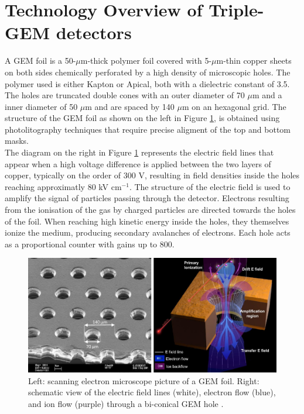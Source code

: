   \section{Technology Overview of Triple-GEM detectors}

    A GEM foil is a 50-$\mu$m-thick polymer foil covered with 5-$\mu$m-thin copper sheets on both sides chemically perforated by a high density of microscopic holes. The polymer used is either Kapton or Apical, both with a dielectric constant of 3.5. The holes are truncated double cones with an outer diameter of 70 $\mu$m and a inner diameter of 50 $\mu$m and are spaced by 140 $\mu$m on an hexagonal grid. The structure of the GEM foil as shown on the left in Figure \ref{fig:II-1-holes}, is obtained using photolitography techniques that require precise aligment of the top and bottom masks. \\

    The diagram on the right in Figure \ref{fig:II-1-holes} represents the electric field lines that appear when a high voltage difference is applied between the two layers of copper, typically on the order of 300 V, resulting in field densities inside the holes reaching approximatly 80 kV cm$^{-1}$. The structure of the electric field is used to amplify the signal of particles passing through the detector. Electrons resulting from the ionisation of the gas by charged particles are directed towards the holes of the foil. When reaching high kinetic energy inside the holes, they themselves ionize the medium, producing secondary avalanches of electrons. Each hole acts as a proportional counter with gains up to 800.  \\

    \begin{figure}[h!]
      \centering
      \includegraphics[width=\textwidth]{img/II-1-gem/holes.pdf}
      \caption{Left: scanning electron microscope picture of a GEM foil. Right: schematic view of the electric field lines (white), electron flow (blue), and ion flow (purple) through a bi-conical GEM hole \cite{Colaleo:2021453}.}
      \label{fig:II-1-holes}
    \end{figure}


